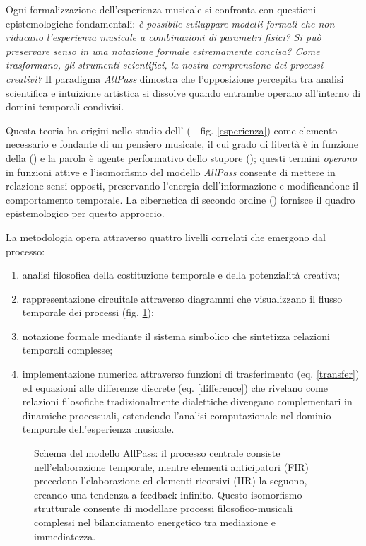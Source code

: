 Ogni formalizzazione dell'esperienza musicale si confronta con questioni epistemologiche fondamentali: \textit{è possibile sviluppare modelli formali che non riducano l'esperienza musicale a combinazioni di parametri fisici? Si può preservare senso in una notazione formale estremamente concisa? Come trasformano, gli strumenti scientifici, la nostra comprensione dei processi creativi?} Il paradigma \emph{AllPass} dimostra che l'opposizione percepita tra analisi scientifica e intuizione artistica si dissolve quando entrambe operano all'interno di domini temporali condivisi.

Questa teoria ha origini nello studio dell' (\cite{bergson1896} - fig. \ref{esperienza}) come elemento necessario e fondante di un pensiero musicale, il cui grado di libertà è in funzione della  (\cite{agamben2017}) e la parola è agente performativo dello stupore (\cite{ronchi2001}); questi termini \emph{operano} in funzioni attive e l'isomorfismo del modello \emph{AllPass} consente di mettere in relazione sensi opposti, preservando l'energia dell'informazione e modificandone il comportamento temporale. La cibernetica di secondo ordine (\cite{vonfoerster1981}) fornisce il quadro epistemologico per questo approccio.

La metodologia opera attraverso quattro livelli correlati che emergono dal processo:
\begin{enumerate}[nosep]
  \item analisi filosofica della costituzione temporale e della potenzialità creativa;
  \item rappresentazione circuitale attraverso diagrammi che visualizzano il flusso temporale dei processi (fig. \ref{apf});
  \item notazione formale mediante il sistema simbolico
    che sintetizza relazioni temporali complesse;
  \item implementazione numerica attraverso funzioni di trasferimento (eq. \ref{transfer}) ed equazioni alle differenze discrete (eq. \ref{difference}) che rivelano come relazioni filosofiche tradizionalmente dialettiche divengano complementari in dinamiche processuali, estendendo l'analisi computazionale nel dominio temporale dell'esperienza musicale.
\end{enumerate}

\begin{figure}[htbp]
\begin{center}
\caption{Schema del modello AllPass: il processo centrale consiste nell'elaborazione temporale, mentre elementi anticipatori (FIR) precedono l'elaborazione ed elementi ricorsivi (IIR) la seguono, creando una tendenza a feedback infinito. Questo isomorfismo strutturale consente di modellare processi filosofico-musicali complessi nel bilanciamento energetico tra mediazione e immediatezza.}
\label{apf}
\end{center}
\end{figure}

